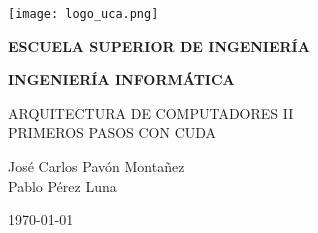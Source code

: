 \pagestyle{empty}
\begin{titlepage}
  \begin{center}

    \texttt{[image: logo\_uca.png]} \\
    
    \vspace{2.0cm}
    
    \LARGE{\textbf{ESCUELA SUPERIOR DE INGENIERÍA}} \\
    
    \vspace{1.0cm}
    
    \Large{\textbf{INGENIERÍA INFORMÁTICA}} \\
    
    \vspace{3.0cm}
    
    \Large{ARQUITECTURA DE COMPUTADORES II} \\
    \Large{PRIMEROS PASOS CON CUDA} \\
    
    \vspace{3.0cm}
    
    \Large{José Carlos Pavón Montañez\\Pablo Pérez Luna} \\
  
    \vspace{0.5cm}

    \large{\today}
    
  \end{center}
\end{titlepage}

\clearpage
